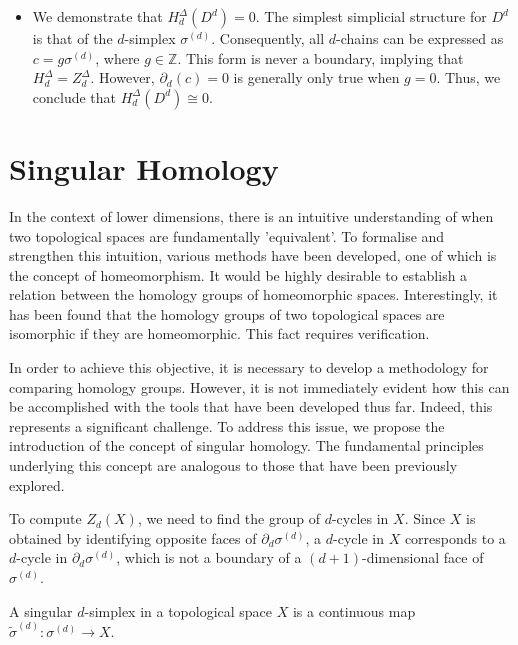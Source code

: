 \begin{example}
\begin{itemize}
		\item We demonstrate that \(H^{\Delta}_{d}(D^{d}) = 0\). The simplest
		      simplicial structure for \(D^{d}\) is that of the \(d\)-simplex \(\sigma^{(d)}\).
		      Consequently, all \(d\)-chains can be expressed as \(c = g \sigma^{(d)}\), where
		      \(g \in \mathbb{Z}\). This form is never a boundary, implying that \(H^{\Delta}_{d} = Z^{\Delta}_{d}\). However, \(\partial_{d}(c) = 0\) is generally only true
		      when \(g = 0\). Thus, we conclude that \(H^{\Delta}_{d}(D^{d}) \cong 0\).
	\end{itemize}
\end{example}

\section{Singular Homology}
\label{SingularHomology}
In the context of lower dimensions, there is an intuitive understanding of when two topological spaces are fundamentally 'equivalent'. To formalise and strengthen this intuition, various methods have been developed, one of which is the concept of homeomorphism. It would be highly desirable to establish a relation between the homology groups of homeomorphic spaces. Interestingly, it has been found that the homology groups of two topological spaces are isomorphic if they are homeomorphic. This fact requires verification.

In order to achieve this objective, it is necessary to develop a methodology for comparing homology groups. However, it is not immediately evident how this can be accomplished with the tools that have been developed thus far. Indeed, this represents a significant challenge. To address this issue, we propose the introduction of the concept of singular homology. The fundamental principles underlying this concept are analogous to those that have been previously explored.

To compute \( Z_{d}(X) \), we need to find the group of \( d \)-cycles in \( X \). Since \( X \) is obtained by identifying opposite faces of \( \partial_{d} \sigma^{(d)} \), a \( d \)-cycle in \( X \) corresponds to a \( d \)-cycle in \( \partial_{d} \sigma^{(d)} \), which is not a boundary of a \( (d+1) \)-dimensional face of \( \sigma^{(d)} \).

\begin{definition}
	A singular \( d \)-simplex in a topological space \( X \) is a continuous map \( \tilde{\sigma}^{(d)}: \sigma^{(d)} \to X \).
\end{definition}

